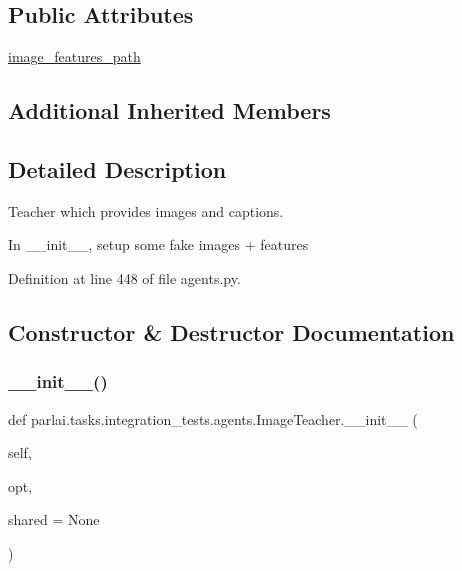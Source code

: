\subsection*{Public Attributes}
\begin{DoxyCompactItemize}
\item 
\hyperlink{classparlai_1_1tasks_1_1integration__tests_1_1agents_1_1ImageTeacher_a252433e0d09c09207362b031aa295696}{image\+\_\+features\+\_\+path}
\end{DoxyCompactItemize}
\subsection*{Additional Inherited Members}


\subsection{Detailed Description}
\begin{DoxyVerb}Teacher which provides images and captions.

In __init__, setup some fake images + features
\end{DoxyVerb}
 

Definition at line 448 of file agents.\+py.



\subsection{Constructor \& Destructor Documentation}
\mbox{\label{classparlai_1_1tasks_1_1integration__tests_1_1agents_1_1ImageTeacher_a3341d0d235586140b1c0c231a21182ff}} 
\subsubsection{\texorpdfstring{\+\_\+\+\_\+init\+\_\+\+\_\+()}{\_\_init\_\_()}}
{\footnotesize\ttfamily def parlai.\+tasks.\+integration\+\_\+tests.\+agents.\+Image\+Teacher.\+\_\+\+\_\+init\+\_\+\+\_\+ (\begin{DoxyParamCaption}\item[{}]{self,  }\item[{}]{opt,  }\item[{}]{shared = {\ttfamily None} }\end{DoxyParamCaption})}



